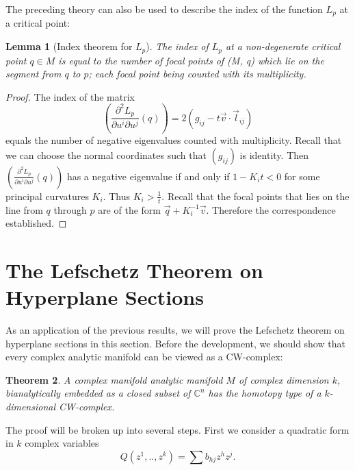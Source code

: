 \documentclass[a4paper,11pt,reqno]{amsart}
\newtheorem{thm}{Theorem}[section]
\newtheorem{lem}[thm]{Lemma}
\newcommand{\CC}{\mathbb{C}}
\newcommand{\vect}[1]{\vec{#1}}
\begin{document}
The preceding theory can also be used to describe the index of the function
$L_p$ at a critical point:

\begin{lem}[Index theorem for $L_p$]
  The index of $L_p$ at a non-degenerate critical point $q \in M$ is equal to
  the number of focal points of (M, q) which lie on the segment from $q$ to $p$;
  each focal point being counted with its multiplicity.
\end{lem}

\begin{proof}
  The index of the matrix 
  \begin{equation}
    \left( \frac{\partial^2 L_p}{\partial u^i \partial
        u^j}(q) \right) = 2(g_{ij}-t\vect{v} \cdot \vect{l}_{ij})
  \end{equation}
  equals the number of negative eigenvalues counted with multiplicity. Recall
  that we can choose the normal coordinates such that $(g_{ij})$ is
  identity. Then$\left( \frac{\partial^2 L_p}{\partial u^i \partial u^j}(q)
  \right)$ has a negative eigenvalue if and only if $1-K_it < 0$ for some
  principal curvatures $K_i$. Thus $K_i > \frac{1}{t}$. Recall that the focal
  points that lies on the line from $q$ through $p$ are of the form
  $\vect{q}+K_i^{-1}\vect{v}$. Therefore the correspondence established.
  
\end{proof}

\section{The Lefschetz Theorem on Hyperplane Sections}

As an application of the previous results, we will prove the Lefschetz theorem
on hyperplane sections in this section. Before the development, we should show
that every complex analytic manifold can be viewed as a CW-complex:

\begin{thm}
  A complex manifold analytic manifold $M$ of complex dimension $k$,
  bianalytically embedded as a closed subset of $\CC^n$ has the homotopy type of
  a $k$-dimensional CW-complex.
\end{thm}

The proof will be broken up into several steps. First we consider a quadratic
form in $k$ complex variables
\begin{equation}
  Q(z^1, .., z^k) = \sum b_{hj}z^hz^j.
\end{equation}
\end{document}
